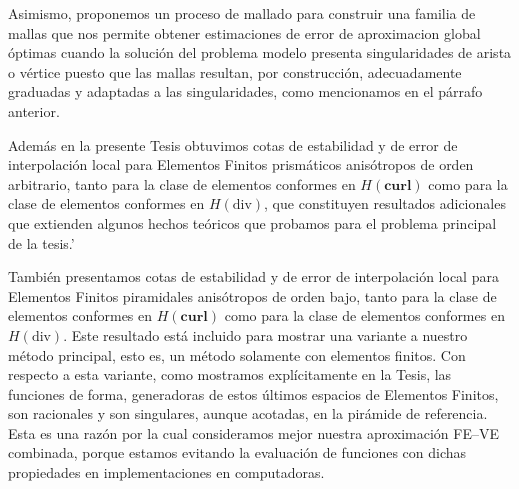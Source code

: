 \documentclass{article}
\def\bcurl{\textbf{curl}}
\begin{document}
Asimismo, proponemos un proceso de mallado
para construir una familia de mallas que nos permite
obtener estimaciones de error de aproximacion global
\'optimas cuando la soluci\'on del problema modelo
presenta singularidades de arista o v\'ertice
puesto que las mallas resultan, por construcci\'on,
adecuadamente gra\-duadas y adaptadas 
a las singularidades, como mencionamos en el p\'arrafo anterior.

Adem\'as en la presente Tesis 
obtuvimos cotas de estabilidad y de error de interpolaci\'on
local para Elementos Finitos prism\'aticos anis\'otropos de orden
arbitrario, tanto para la clase de elementos
conformes en $H(\bcurl)$ como para 
la clase de elementos conformes en $H(\mbox{div})$, que 
constituyen resultados adicionales que extienden algunos hechos te\'oricos
que probamos para el problema principal de la tesis.'

Tambi\'en presentamos 
cotas de estabilidad y de error de interpolaci\'on
local para Elementos Finitos piramidales anis\'otropos 
de orden bajo, tanto para la clase de elementos
conformes en $H(\bcurl)$ como para 
la clase de elementos conformes en $H(\mbox{div})$. Este resultado
est\'a incluido para mostrar una variante a nuestro m\'etodo principal,
esto es, un m\'etodo solamente con elementos finitos. Con respecto a esta variante,
como
mostramos expl\'icitamente en la Tesis, las 
funciones de forma, generadoras de 
estos \'ultimos espacios de Elementos Finitos,
son racionales y son singulares, aunque acotadas,
en la pir\'amide de referencia. Esta es una raz\'on por la cual 
consideramos mejor nuestra aproximaci\'on FE--VE combinada, porque estamos
evitando la evaluaci\'on de funciones con dichas propiedades
en implementaciones en computadoras.

    
\end{document}
